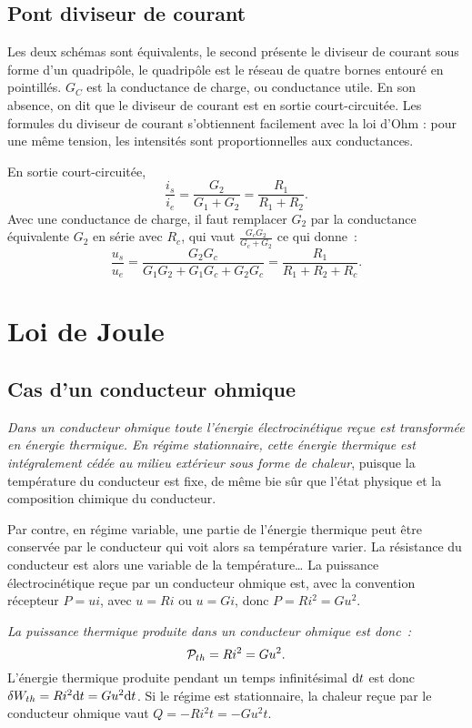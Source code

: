 \subsection{Pont diviseur de courant}
Les deux schémas sont équivalents, le second présente le diviseur de courant sous forme d'un quadripôle, le quadripôle est le réseau de quatre bornes entouré en pointillés. $G_C$ est la conductance de charge, ou conductance utile. En son absence, on dit que le diviseur de courant est en sortie court-circuitée. Les formules du diviseur de courant s'obtiennent facilement avec la loi d'Ohm : pour une même tension, les intensités sont proportionnelles aux conductances.

En sortie court-circuitée,
\begin{equation}\label{eq:pontdiviseuri}
\frac{i_s}{i_e} = \frac{G_2}{G_1+G_2} = \frac{R_1}{R_1+R_2}.
\end{equation}
Avec une conductance de charge, il faut remplacer $G_2$ par la conductance équivalente $G_2$ en série avec $R_c$, qui vaut $\frac{G_cG_2}{G_c+G_2}$ ce qui donne~:
\begin{equation}\label{eq:diviseuri_gc}
\frac{u_s}{u_e} = \frac{G_2G_c}{G_1G_2+G_1G_c+G_2G_c} = \frac{R_1}{R_1+R_2+R_c}.
\end{equation}

\section{Loi de Joule}
\subsection{Cas d'un conducteur ohmique}

\emph{Dans un conducteur ohmique toute l'énergie électrocinétique reçue est transformée en énergie thermique. En régime stationnaire, cette énergie thermique est intégralement cédée au milieu extérieur sous forme de chaleur}, puisque la température du conducteur est fixe, de même bie sûr que l'état physique et la composition chimique du conducteur.

Par contre, en régime variable, une partie de l'énergie thermique peut être conservée par le conducteur qui voit alors sa température varier. La résistance du conducteur est alors une variable de la température\ldots{} La puissance électrocinétique reçue par un conducteur ohmique est, avec la convention récepteur $P = ui$, avec $u=Ri$ ou $u=Gi$, donc $P=R i^2 = G u^2$.

\emph{La puissance thermique produite dans un conducteur ohmique est donc~:}
\begin{equation}\label{eq:loidejoule}
\P_{th} = Ri^2=Gu^2.
\end{equation}
L'énergie thermique produite pendant un temps infinitésimal $\D t$ est donc $\delta W_{th} = Ri^2 \D t = Gu^2 \D t$. Si le régime est stationnaire, la chaleur reçue par le conducteur ohmique vaut $Q = -Ri^2 t = -Gu^2 t$.

